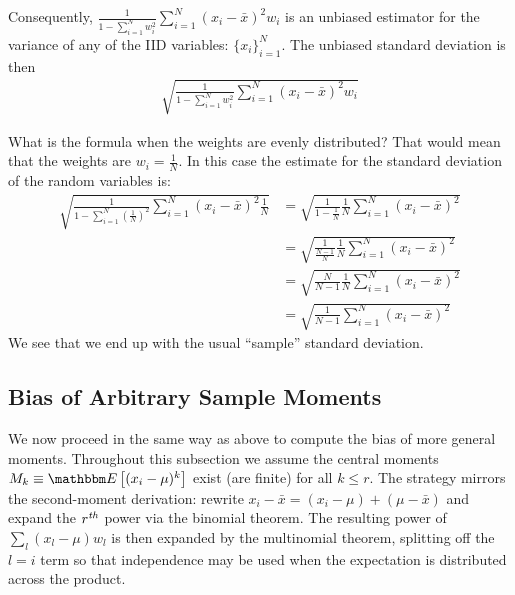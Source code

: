 \documentclass{article}
\newcommand{\E}[1]{\mathbbm E\left[#1\right]}
\begin{document}
Consequently, $\frac{1}{1 - \sum_{i=1}^N w_i^2} \sum_{i=1}^N (x_i - {\bar x})^2 w_i$ 
is an unbiased estimator for the variance of any of the IID variables: $\{x_i\}_{i=1}^N$. 
The unbiased standard deviation is then
\begin{align}
    \sqrt{\frac{1}{1 - \sum_{i=1}^N w_i^2} \sum_{i=1}^N (x_i - {\bar x})^2 w_i} 
\end{align}

What is the formula when the weights are evenly distributed? That would mean that the weights are $w_i = \frac{1}{N}$.
In this case the estimate for the standard deviation of the random variables is:
\begin{align*}
     \sqrt{\frac{1}{1 - \sum_{i=1}^N \left(\frac{1}{N}\right)^2} \sum_{i=1}^N (x_i - {\bar x})^2 \frac{1}{N}} 
                   &=  \sqrt{\frac{1}{1 - \frac{1}{N}} \frac{1}{N} \sum_{i=1}^N (x_i - {\bar x})^2 } \\
                   &=  \sqrt{\frac{1}{\frac{N - 1}{N}} \frac{1}{N} \sum_{i=1}^N (x_i - {\bar x})^2 } \\
                   &=  \sqrt{\frac{N}{N - 1} \frac{1}{N} \sum_{i=1}^N (x_i - {\bar x})^2 } \\
                   &=  \sqrt{\frac{1}{N - 1} \sum_{i=1}^N (x_i - {\bar x})^2 } 
\end{align*}
We see that we end up with the usual ``sample'' standard deviation.

\subsection{Bias of Arbitrary Sample Moments}

We now proceed in the same way as above to compute the bias of more general moments.
Throughout this subsection we assume the central moments
$M_k \equiv \E{(x_i - \mu)^k}$ exist (are finite) for all $k \le r$.
The strategy mirrors the second-moment derivation: rewrite $x_i - {\bar x} = (x_i - \mu) + (\mu - {\bar x})$
and expand the $r^{\it th}$ power via the binomial theorem.
The resulting power of $\sum_l (x_l - \mu) w_l$ is then expanded by the multinomial theorem,
splitting off the $l = i$ term so that independence may be used when the expectation is distributed
across the product.
\end{document}
